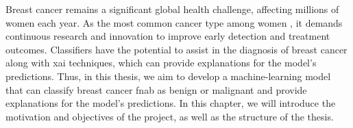 

Breast cancer remains a significant global health challenge, affecting millions of women \cite{wcrf_international_breast_nodate} each year. As the most common cancer type among women \cite{wcrf_international_breast_nodate}, it demands continuous research and innovation to improve early detection and treatment outcomes. Classifiers have the potential to assist in the diagnosis of breast cancer along with \ac{xai} techniques, which can provide explanations for the model's predictions. Thus, in this thesis, we aim to develop a machine-learning model that can classify breast cancer \ac{fnab} as benign or malignant and provide explanations for the model's predictions. In this chapter, we will introduce the motivation and objectives of the project, as well as the structure of the thesis.
